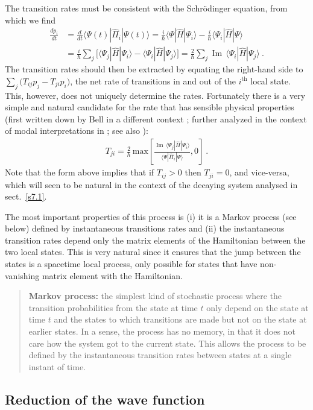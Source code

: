 \documentclass[12pt]{article}
\theoremstyle{plain}
\theoremstyle{definition}
\theoremstyle{remark}
\newcommand{\IM}{\operatorname{Im}}
\def\bra#1{\langle #1|}
\def\ket#1{| #1\rangle}
\newcommand{\EQ}[1]{\begin{equation}\begin{split} #1
\end{split}\end{equation}}
\begin{document}
The transition rates must be consistent with the Schr\"odinger equation, from which we find
\EQ{
\frac{dp_i}{dt}&=\frac d{dt}\bra{\Psi(t)}\hat\Pi_i\ket{\Psi(t)}=
\frac i\hbar\bra{\Psi}\hat H\ket{\Psi_i}-\frac i\hbar\bra{\Psi_i}\hat H\ket{\Psi}\\
&=\frac i\hbar\sum_j\Big[\bra{\Psi_j}\hat H\ket{\Psi_i}-\bra{\Psi_i}\hat H\ket{\Psi_j}\Big]
=\frac2\hbar\sum_j\IM\,\bra{\Psi_i}\hat H\ket{\Psi_j}\ .
}
The transition rates should then be extracted by equating the right-hand side to $\sum_j\big(T_{ij}p_j-T_{ji}p_i\big)$, the net rate of transitions in and out of the $i^\text{th}$ local state. This, however, does not uniquely determine the rates. 
Fortunately there is a very simple and natural candidate for the rate that has sensible physical properties (first written down by Bell in a different context \cite{Bell:2004suqm}; further analyzed in the context of modal interpretations in \cite{BD10}; see also \cite{Sud1}):
\EQ{
T_{ji}=\frac2\hbar\,\text{max}\left[\frac{\IM\,\bra{\Psi_j}\hat H\ket{\Psi_i}}{\bra{\Psi}\hat\Pi_i\ket{\Psi}},0\right]\ .
\label{trs}
}
Note that the form above implies that if $T_{ij}>0$ then $T_{ji}=0$, and vice-versa, which will seen to be natural in the context of the decaying system analysed in sect.~\ref{s7.1}.

The most important properties of this process is (i) it is a Markov process (see below) defined by instantaneous transitions rates and (ii)  the instantaneous transition rates depend only the matrix elements of the Hamiltonian between the two local states. This is very natural since it ensures that the jump between the states is 
a spacetime local process, only possible for states that have non-vanishing matrix element with the Hamiltonian.  
\begin{quote}{\bf Markov process:} the simplest kind of stochastic process where the transition probabilities from the state at time $t$ only depend on the state at time $t$ and the states to which transitions are made but not on the state at earlier states. In a sense, the process has no memory, in that it does not care  how the system got to the current state. This allows the process to be defined by the instantaneous transition rates between states at a single instant of time.
\end{quote}


\subsection{Reduction of the wave function}\label{s6.2}
\end{document}
